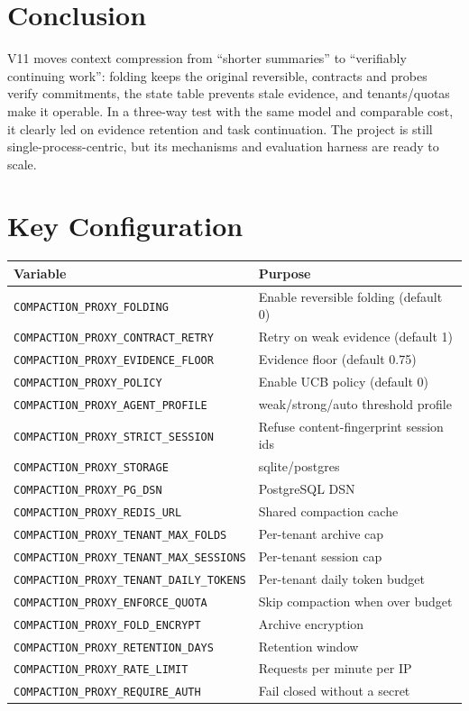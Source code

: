 \documentclass[11pt,a4paper]{article}
\begin{document}
\section{Conclusion}
V11 moves context compression from ``shorter summaries'' to ``verifiably continuing work'': folding keeps the original reversible, contracts and probes verify commitments, the state table prevents stale evidence, and tenants/quotas make it operable. In a three-way test with the same model and comparable cost, it clearly led on evidence retention and task continuation. The project is still single-process-centric, but its mechanisms and evaluation harness are ready to scale.

\appendix
\section{Key Configuration}
\begin{longtable}{p{6.2cm}p{8.2cm}}
\toprule
Variable & Purpose \\
\midrule
\texttt{COMPACTION\_PROXY\_FOLDING} & Enable reversible folding (default 0) \\
\texttt{COMPACTION\_PROXY\_CONTRACT\_RETRY} & Retry on weak evidence (default 1) \\
\texttt{COMPACTION\_PROXY\_EVIDENCE\_FLOOR} & Evidence floor (default 0.75) \\
\texttt{COMPACTION\_PROXY\_POLICY} & Enable UCB policy (default 0) \\
\texttt{COMPACTION\_PROXY\_AGENT\_PROFILE} & weak/strong/auto threshold profile \\
\texttt{COMPACTION\_PROXY\_STRICT\_SESSION} & Refuse content-fingerprint session ids \\
\texttt{COMPACTION\_PROXY\_STORAGE} & sqlite/postgres \\
\texttt{COMPACTION\_PROXY\_PG\_DSN} & PostgreSQL DSN \\
\texttt{COMPACTION\_PROXY\_REDIS\_URL} & Shared compaction cache \\
\texttt{COMPACTION\_PROXY\_TENANT\_MAX\_FOLDS} & Per-tenant archive cap \\
\texttt{COMPACTION\_PROXY\_TENANT\_MAX\_SESSIONS} & Per-tenant session cap \\
\texttt{COMPACTION\_PROXY\_TENANT\_DAILY\_TOKENS} & Per-tenant daily token budget \\
\texttt{COMPACTION\_PROXY\_ENFORCE\_QUOTA} & Skip compaction when over budget \\
\texttt{COMPACTION\_PROXY\_FOLD\_ENCRYPT} & Archive encryption \\
\texttt{COMPACTION\_PROXY\_RETENTION\_DAYS} & Retention window \\
\texttt{COMPACTION\_PROXY\_RATE\_LIMIT} & Requests per minute per IP \\
\texttt{COMPACTION\_PROXY\_REQUIRE\_AUTH} & Fail closed without a secret \\
\bottomrule
\end{longtable}
\end{document}
